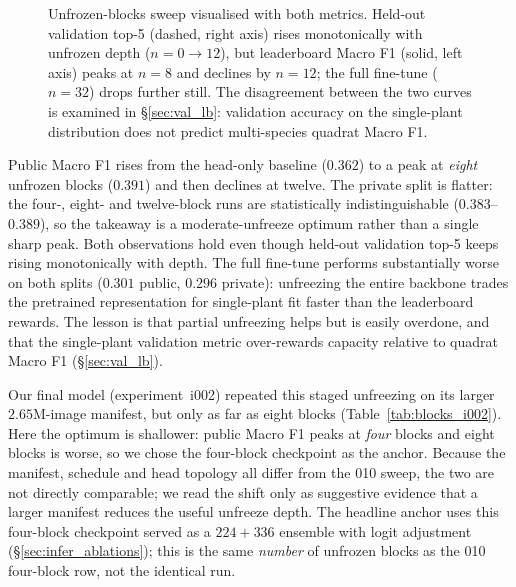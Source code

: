 \begin{figure}[!htbp]
  \centering
  
  \caption{Unfrozen-blocks sweep visualised with both metrics. Held-out validation top-5 (dashed, right axis) rises monotonically with unfrozen depth ($n{=}0\rightarrow12$), but leaderboard Macro F1 (solid, left axis) peaks at $n{=}8$ and declines by $n{=}12$; the full fine-tune ($n{=}32$) drops further still. The disagreement between the two curves is examined in \S\ref{sec:val_lb}: validation accuracy on the single-plant distribution does not predict multi-species quadrat Macro F1.}
  \label{fig:unfreeze_sweep}
\end{figure}

Public Macro F1 rises from the head-only baseline ($0.362$) to a peak at \emph{eight} unfrozen
blocks ($0.391$) and then declines at twelve. The private split is flatter: the four-, eight- and
twelve-block runs are statistically indistinguishable ($0.383$--$0.389$), so the takeaway is a
moderate-unfreeze optimum rather than a single sharp peak. Both observations hold even though
held-out validation top-5 keeps rising monotonically with depth. The full fine-tune performs
substantially worse on both splits ($0.301$ public, $0.296$ private): unfreezing the entire backbone
trades the pretrained representation for single-plant fit faster than the leaderboard rewards. The
lesson is that partial unfreezing helps but is easily overdone, and that the single-plant validation
metric over-rewards capacity relative to quadrat Macro F1 (\S\ref{sec:val_lb}).

Our final model (experiment~i002) repeated this staged unfreezing on its larger $2.65$M-image
manifest, but only as far as eight blocks (Table~\ref{tab:blocks_i002}). Here the optimum is
shallower: public Macro F1 peaks at \emph{four} blocks and eight blocks is worse, so we chose the
four-block checkpoint as the anchor. Because the manifest, schedule and head topology all differ
from the 010 sweep, the two are not directly comparable; we read the shift only as suggestive
evidence that a larger manifest reduces the useful unfreeze depth. The headline anchor uses this four-block
checkpoint served as a $224{+}336$ ensemble with logit adjustment (\S\ref{sec:infer_ablations});
this is the same \emph{number} of unfrozen blocks as the 010 four-block row, not the identical run.

